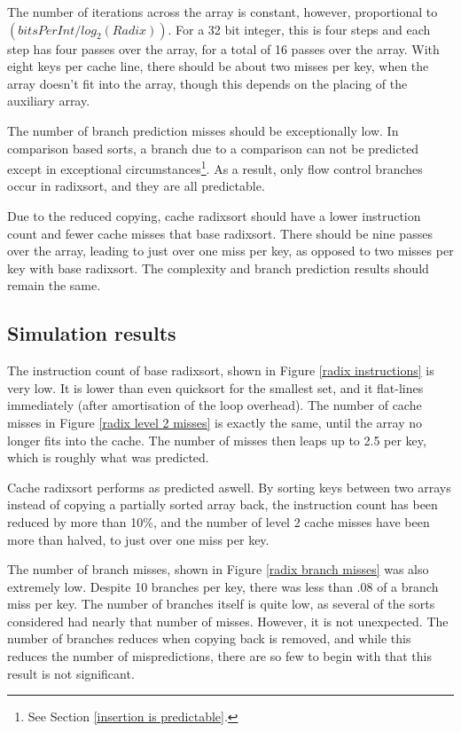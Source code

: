 The number of iterations across the array is constant, however, proportional to
$(bitsPerInt/log_2(Radix))$. For a 32 bit integer, this is four steps and each step
has four passes over the array, for a total of 16 passes over the array.  With
eight keys per cache line, there should be about two misses per key, when the
array doesn't fit into the array, though this depends on the placing of the
auxiliary array.

The number of branch prediction misses should be exceptionally low. In
comparison based sorts, a branch due to a comparison can not be predicted except
in exceptional circumstances\footnote{See Section \ref{insertion is
predictable}.}. As a result, only flow control branches occur in radixsort, and
they are all predictable.

Due to the reduced copying, cache radixsort should have a lower instruction
count and fewer cache misses that base radixsort. There should be nine passes
over the array, leading to just over one miss per key, as opposed to two misses
per key with base radixsort. The complexity and branch prediction results
should remain the same.

\subsection{Simulation results}

The instruction count of base radixsort, shown in Figure \ref{radix instructions} is
very low. It is lower than even quicksort for the smallest set, and it
flat-lines immediately (after amortisation of the loop overhead). The number of
cache misses in Figure \ref{radix level 2 misses} is exactly the same, until
the array no longer fits into the cache. The number of misses then leaps up to
2.5 per key, which is roughly what was predicted.

Cache radixsort performs as predicted aswell. By sorting keys between two
arrays instead of copying a partially sorted array back, the instruction count
has been reduced by more than 10\%, and the number of level 2 cache misses
have been more than halved, to just over one miss per key.

The number of branch misses, shown in Figure \ref{radix branch misses} was also
extremely low. Despite 10 branches per key, there was less than .08 of a branch
miss per key. The number of branches itself is quite low, as several of the
sorts considered had nearly that number of misses. However, it is not
unexpected. The number of branches reduces when copying back is removed, and
while this reduces the number of mispredictions, there are so few to begin with
that this result is not significant.

